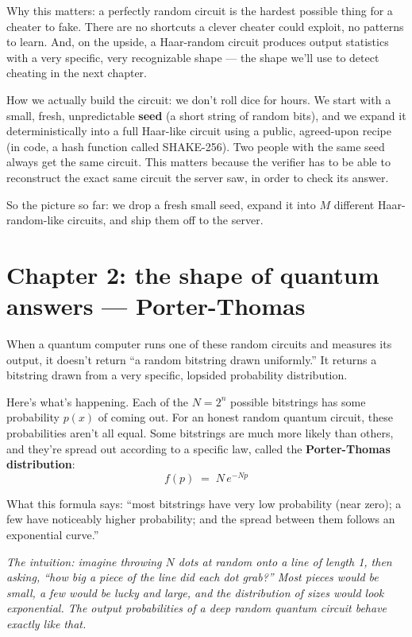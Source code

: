 \documentclass[11pt]{article}
\newenvironment{aside}{\par\medskip\noindent\itshape\small\color{black!70}}{\normalfont\par\medskip}
\newcommand{\formula}[1]{\[\boxed{#1}\]}
\begin{document}
Why this matters: a perfectly random circuit is the hardest possible thing for a cheater to fake. There are no shortcuts a clever cheater could exploit, no patterns to learn. And, on the upside, a Haar-random circuit produces output statistics with a very specific, very recognizable shape --- the shape we'll use to detect cheating in the next chapter.

How we actually build the circuit: we don't roll dice for hours. We start with a small, fresh, unpredictable \textbf{seed} (a short string of random bits), and we expand it deterministically into a full Haar-like circuit using a public, agreed-upon recipe (in code, a hash function called SHAKE-256). Two people with the same seed always get the same circuit. This matters because the verifier has to be able to reconstruct the exact same circuit the server saw, in order to check its answer.

So the picture so far: we drop a fresh small seed, expand it into $M$ different Haar-random-like circuits, and ship them off to the server.

\section{Chapter 2: the shape of quantum answers --- Porter-Thomas}

When a quantum computer runs one of these random circuits and measures its output, it doesn't return ``a random bitstring drawn uniformly.'' It returns a bitstring drawn from a very specific, lopsided probability distribution.

Here's what's happening. Each of the $N = 2^n$ possible bitstrings has some probability $p(x)$ of coming out. For an honest random quantum circuit, these probabilities aren't all equal. Some bitstrings are much more likely than others, and they're spread out according to a specific law, called the \textbf{Porter-Thomas distribution}:
\formula{f(p) \;=\; N\, e^{-Np}}

\noindent What this formula says: ``most bitstrings have very low probability (near zero); a few have noticeably higher probability; and the spread between them follows an exponential curve.''

\begin{aside}
The intuition: imagine throwing $N$ dots at random onto a line of length 1, then asking, ``how big a piece of the line did each dot grab?'' Most pieces would be small, a few would be lucky and large, and the distribution of sizes would look exponential. The output probabilities of a deep random quantum circuit behave exactly like that.
\end{aside}
\end{document}
